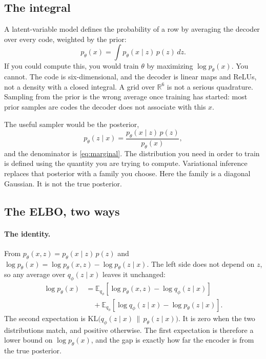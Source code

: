 \documentclass[11pt]{article}
\begin{document}
\subsection{The integral}

A latent-variable model defines the probability of a row by averaging
the decoder over every code, weighted by the prior:
\begin{equation}
\label{eq:marginal}
p_{\theta}(x)
= \int p_{\theta}(x\mid z)\, p(z)\, dz.
\end{equation}
If you could compute this, you would train $\theta$ by maximizing
$\log p_{\theta}(x)$. You cannot. The code is six-dimensional, and the
decoder is linear maps and ReLUs, not a density with a closed integral.
A grid over $\mathbb{R}^{6}$ is not a serious quadrature. Sampling from
the prior is the wrong average once training has started: most prior
samples are codes the decoder does not associate with this $x$.

The useful sampler would be the posterior,
\[
p_{\theta}(z\mid x)
= \frac{p_{\theta}(x\mid z)\,p(z)}{p_{\theta}(x)},
\]
and the denominator is \eqref{eq:marginal}. The distribution you need in
order to train is defined using the quantity you are trying to compute.
Variational inference replaces that posterior with a family you choose.
Here the family is a diagonal Gaussian. It is not the true posterior.

\subsection{The ELBO, two ways}
\label{sec:elbo}

\paragraph{The identity.}
From $p_{\theta}(x,z)=p_{\theta}(x\mid z)\,p(z)$ and
$\log p_{\theta}(x)=\log p_{\theta}(x,z)-\log p_{\theta}(z\mid x)$.
The left side does not depend on $z$, so any average over
$q_{\phi}(z\mid x)$ leaves it unchanged:
\begin{align}
\log p_{\theta}(x)
&= \mathbb{E}_{q_{\phi}}\!\left[\log p_{\theta}(x,z)-\log q_{\phi}(z\mid x)\right] \nonumber\\
&\quad + \mathbb{E}_{q_{\phi}}\!\left[\log q_{\phi}(z\mid x)-\log p_{\theta}(z\mid x)\right].
\label{eq:identity}
\end{align}
The second expectation is
$\mathrm{KL}\!\big(q_{\phi}(z\mid x)\,\|\,p_{\theta}(z\mid x)\big)$.
It is zero when the two distributions match, and positive otherwise.
The first expectation is therefore a lower bound on $\log p_{\theta}(x)$,
and the gap is exactly how far the encoder is from the true posterior.
\end{document}
